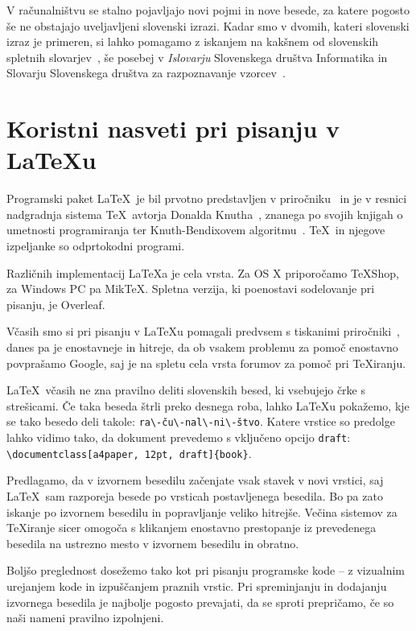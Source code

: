 \documentclass[a4paper,12pt,openright]{book}
\begin{document}
V računalništvu se stalno pojavljajo novi pojmi in nove besede, za katere pogosto še ne obstajajo uveljavljeni slovenski izrazi.
Kadar smo v dvomih, kateri slovenski izraz je primeren, si lahko pomagamo z iskanjem na kakšnem od slovenskih spletnih slovarjev~\cite{slovarji}, še posebej v
\textit{Islovarju} Slovenskega društva Informatika \cite{Islovar} in Slovarju Slovenskega društva za razpoznavanje vzorcev~\cite{sdrv}.


\chapter{Koristni nasveti pri pisanju v \LaTeX{u}}
\label{latex}

Programski paket \LaTeX\ je bil prvotno predstavljen v priročniku~\cite{lamport} in je v resnici nadgradnja sistema \TeX\ avtorja Donalda Knutha~\cite{knuth}, 
znanega po svojih knjigah o umetnosti programiranja
ter Knuth-Bendixovem algoritmu~\cite{knuth1983simple}.
\TeX\ in njegove izpeljanke so odprtokodni programi.

Različnih implementacij \LaTeX{}a je cela vrsta.
Za OS X priporočamo TeXShop, za Windows PC pa MikTeX.
Spletna verzija, ki poenostavi sodelovanje pri pisanju, je Overleaf.

Včasih smo si pri pisanju v \LaTeX{}u  pomagali predvsem s tiskanimi pri\-ro\-čni\-ki~\cite{lamport}, danes pa je enostavneje in hitreje, da ob vsakem problemu za pomoč enostavno povprašamo Google, 
saj je na spletu cela vrsta forumov za pomoč pri \TeX iranju.

\LaTeX\ včasih ne zna pravilno deliti slovenskih besed, ki vsebujejo črke s streši\-ca\-mi. 
Če taka beseda štrli preko desnega roba,  lahko \LaTeX{}u pokažemo, kje se tako besedo deli takole: \verb=ra\-ču\-nal\-ni\-štvo=.
Katere vrstice so predolge lahko vidimo tako, da dokument prevedemo s vključeno opcijo \texttt{draft}: \verb=\documentclass[a4paper, 12pt, draft]{book}=.

Predlagamo, da v izvornem besedilu začenjate vsak stavek v novi vrstici, saj \LaTeX\ sam razporeja besede po vrsticah postavljenega besedila. 
Bo pa zato iskanje po izvornem besedilu in popravljanje veliko hitrejše. 
Večina sistemov za \TeX{}iranje sicer omogoča s klikanjem enostavno prestopanje  iz prevedenega besedila na ustrezno mesto v izvornem besedilu in obratno.

Boljšo preglednost dosežemo tako kot pri pisanju programske kode -- z vizualnim urejanjem kode in izpuščanjem praznih vrstic.
Pri spreminjanju in dodajanju izvornega besedila je najbolje pogosto prevajati, da se sproti prepričamo, če so naši nameni pravilno izpolnjeni.
\end{document}
